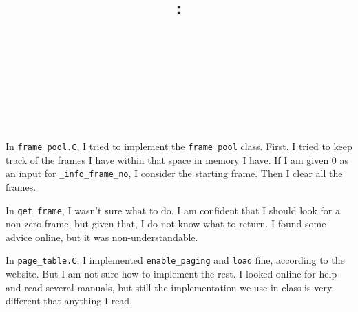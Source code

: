 \documentclass[10pt]{article}
\title{
	\horrule{0.5pt}\\
	\Large \course: \homeworkNumber\\
    \normalsize \name \\
    \normalsize \duedate \\
    \horrule{0.5pt}\\
}
\author{}
\date{}
\theoremstyle{plain}
\theoremstyle{definition}
\begin{document}
\maketitle

In \texttt{frame\_pool.C}, I tried to implement the \texttt{frame\_pool} class. First, I tried to keep track of the frames I have within that space in memory I have. If I am given 0 as an input for \texttt{\_info\_frame\_no}, I consider the starting frame. Then I clear all the frames.

In \texttt{get\_frame}, I wasn't sure what to do. I am confident that I should look for a non-zero frame, but given that, I do not know what to return. I found some advice online, but it was non-understandable.

In \texttt{page\_table.C}, I implemented \texttt{enable\_paging} and \texttt{load} fine, according to the website. But I am not sure how to implement the rest. I looked online for help and read several manuals, but still the implementation we use in class is very different that anything I read.
\end{document}
